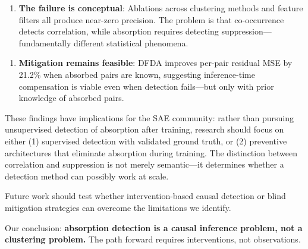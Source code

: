 \documentclass{article}
\begin{document}
\begin{enumerate}
  \item \textbf{The failure is conceptual}: Ablations across clustering methods and feature filters all produce near-zero precision. The problem is that co-occurrence detects correlation, while absorption requires detecting suppression---fundamentally different statistical phenomena.
\end{enumerate}

\begin{enumerate}
  \item \textbf{Mitigation remains feasible}: DFDA improves per-pair residual MSE by 21.2\% when absorbed pairs are known, suggesting inference-time compensation is viable even when detection fails---but only with prior knowledge of absorbed pairs.
\end{enumerate}

These findings have implications for the SAE community: rather than pursuing unsupervised detection of absorption after training, research should focus on either (1) supervised detection with validated ground truth, or (2) preventive architectures that eliminate absorption during training. The distinction between correlation and suppression is not merely semantic---it determines whether a detection method can possibly work at scale.

Future work should test whether intervention-based causal detection or blind mitigation strategies can overcome the limitations we identify.

Our conclusion: \textbf{absorption detection is a causal inference problem, not a clustering problem.} The path forward requires interventions, not observations.
\end{document}
